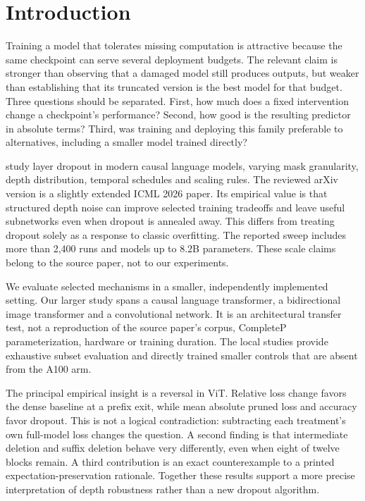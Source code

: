 \documentclass[10pt,letterpaper]{article}
\begin{document}
\clearpage
\section{Introduction}
Training a model that tolerates missing computation is attractive because the same checkpoint can serve several deployment budgets. The relevant claim is stronger than observing that a damaged model still produces outputs, but weaker than establishing that its truncated version is the best model for that budget. Three questions should be separated. First, how much does a fixed intervention change a checkpoint's performance? Second, how good is the resulting predictor in absolute terms? Third, was training and deploying this family preferable to alternatives, including a smaller model trained directly?

\citet{target} study layer dropout in modern causal language models, varying mask granularity, depth distribution, temporal schedules and scaling rules. The reviewed arXiv version is a slightly extended ICML 2026 paper. Its empirical value is that structured depth noise can improve selected training tradeoffs and leave useful subnetworks even when dropout is annealed away. This differs from treating dropout solely as a response to classic overfitting. The reported sweep includes more than 2,400 runs and models up to 8.2B parameters. These scale claims belong to the source paper, not to our experiments.

We evaluate selected mechanisms in a smaller, independently implemented setting. Our larger study spans a causal language transformer, a bidirectional image transformer and a convolutional network. It is an architectural transfer test, not a reproduction of the source paper's corpus, CompleteP parameterization, hardware or training duration. The local studies provide exhaustive subset evaluation and directly trained smaller controls that are absent from the A100 arm.

The principal empirical insight is a reversal in ViT. Relative loss change favors the dense baseline at a prefix exit, while mean absolute pruned loss and accuracy favor dropout. This is not a logical contradiction: subtracting each treatment's own full-model loss changes the question. A second finding is that intermediate deletion and suffix deletion behave very differently, even when eight of twelve blocks remain. A third contribution is an exact counterexample to a printed expectation-preservation rationale. Together these results support a more precise interpretation of depth robustness rather than a new dropout algorithm.
\end{document}
